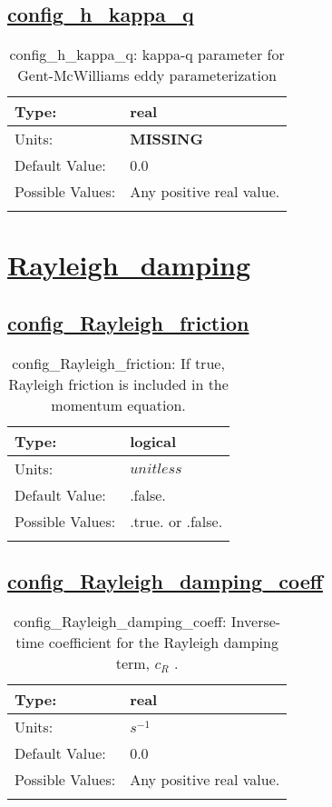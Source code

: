 \subsection[config\_h\_kappa\_q]{\hyperref[sec:nm_tab_standard_GM]{config\_h\_kappa\_q}}
\label{subsec:nm_sec_config_h_kappa_q}
\begin{center}
\begin{longtable}{| p{2.0in} | p{4.0in} |}
    \hline
    Type: & real \\
    \hline
    Units: & {\bf \color{red} MISSING} \\
    \hline
    Default Value: & 0.0 \\
    \hline
    Possible Values: & Any positive real value. \\
    \hline
    \caption{config\_h\_kappa\_q: kappa-q parameter for Gent-McWilliams eddy parameterization}
\end{longtable}
\end{center}
\section[Rayleigh\_damping]{\hyperref[sec:nm_tab_Rayleigh_damping]{Rayleigh\_damping}}
\label{sec:nm_sec_Rayleigh_damping}
\subsection[config\_Rayleigh\_friction]{\hyperref[sec:nm_tab_Rayleigh_damping]{config\_Rayleigh\_friction}}
\label{subsec:nm_sec_config_Rayleigh_friction}
\begin{center}
\begin{longtable}{| p{2.0in} | p{4.0in} |}
    \hline
    Type: & logical \\
    \hline
    Units: & $unitless$ \\
    \hline
    Default Value: & .false. \\
    \hline
    Possible Values: & .true. or .false. \\
    \hline
    \caption{config\_Rayleigh\_friction: If true, Rayleigh friction is included in the momentum equation.}
\end{longtable}
\end{center}
\subsection[config\_Rayleigh\_damping\_coeff]{\hyperref[sec:nm_tab_Rayleigh_damping]{config\_Rayleigh\_damping\_coeff}}
\label{subsec:nm_sec_config_Rayleigh_damping_coeff}
\begin{center}
\begin{longtable}{| p{2.0in} | p{4.0in} |}
    \hline
    Type: & real \\
    \hline
    Units: & $s^{-1}$ \\
    \hline
    Default Value: & 0.0 \\
    \hline
    Possible Values: & Any positive real value. \\
    \hline
    \caption{config\_Rayleigh\_damping\_coeff:  Inverse-time coefficient for the Rayleigh damping term,  $c_R$ .}
\end{longtable}
\end{center}
